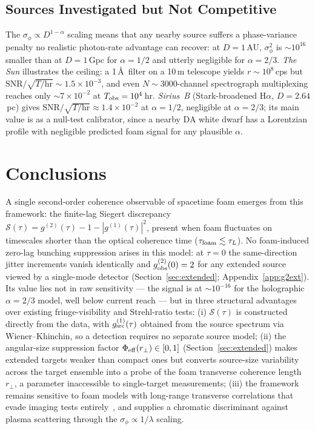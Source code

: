 \documentclass[aps,prd,onecolumn,amsmath,amssymb]{revtex4-2}
\begin{document}
\subsection{Sources Investigated but Not Competitive}
\label{sec:not_competitive}

The $\sigma_\phi \propto D^{1-\alpha}$ scaling means that any nearby source
suffers a phase-variance penalty no realistic photon-rate advantage can
recover: at $D = 1$\,AU, $\sigma_\phi^2$ is ${\sim}10^{16}$ smaller than
at $D = 1$\,Gpc for $\alpha = 1/2$ and utterly negligible for $\alpha = 2/3$.
\textit{The Sun} illustrates the ceiling: a 1\,\AA\ filter on a 10\,m
telescope yields $r \sim 10^8$\,cps but
$\mathrm{SNR}/\sqrt{T/\mathrm{hr}} \sim 1.5\times10^{-3}$, and even
$N \sim 3000$-channel spectrograph multiplexing reaches only
${\sim}7\times10^{-2}$ at $T_{\rm obs} = 10^4$\,hr.
\textit{Sirius~B} (Stark-broadened H$\alpha$, $D = 2.64$\,pc) gives
$\mathrm{SNR}/\sqrt{T/\mathrm{hr}} \approx 1.4\times10^{-2}$ at
$\alpha = 1/2$, negligible at $\alpha = 2/3$; its main value is as a
null-test calibrator, since a nearby DA white dwarf has a Lorentzian
profile with negligible predicted foam signal for any plausible $\alpha$.

\section{Conclusions}
\label{sec:conclusions}

A single second-order coherence observable of spacetime foam emerges from
this framework: the finite-lag Siegert discrepancy
$\mathcal{S}(\tau) = g^{(2)}(\tau)-1-|g^{(1)}(\tau)|^2$, present when foam
fluctuates on timescales shorter than the optical coherence time
($\tau_{\rm foam}\lesssim\tau_L$).  No foam-induced zero-lag bunching
suppression arises in this model: at $\tau = 0$ the same-direction jitter
increments vanish identically and $g^{(2)}_{\rm obs}(0) = 2$ for any
extended source viewed by a single-mode detector
(Section~\ref{sec:extended}; Appendix~\ref{app:g2ext}).  Its value lies
not in raw sensitivity --- the signal is at ${\sim}10^{-16}$ for the
holographic $\alpha = 2/3$ model, well below current reach --- but in
three structural advantages over existing fringe-visibility and
Strehl-ratio tests:
(i) $\mathcal{S}(\tau)$ is constructed directly from the data, with
$g^{(1)}_{\rm src}(\tau)$ obtained from the source spectrum via
Wiener--Khinchin, so a detection requires no separate source model;
(ii) the angular-size suppression factor $\Phi_{\rm eff}(r_\perp)\in[0,1]$
(Section~\ref{sec:extended}) makes extended targets weaker than compact
ones but converts source-size variability across the target ensemble into
a probe of the foam transverse coherence length $r_\perp$, a parameter
inaccessible to single-target measurements;
(iii) the framework remains sensitive to foam models with long-range
transverse correlations that evade imaging tests
entirely~\cite{LeeZurekChen2024}, and supplies a chromatic discriminant
against plasma scattering through the $\sigma_\phi \propto 1/\lambda$
scaling.
\end{document}
